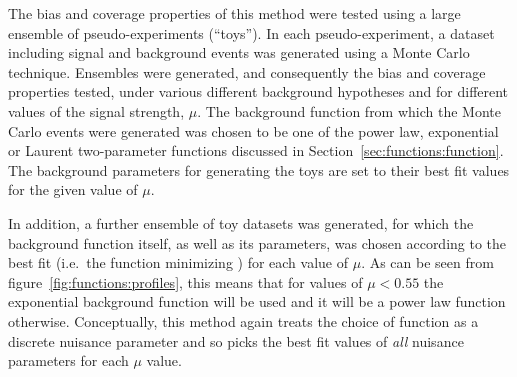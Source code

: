 The bias and coverage properties of this method were tested
using a large ensemble of
pseudo-experiments (``toys''). In each pseudo-experiment, a
dataset including signal and background events was generated using a Monte Carlo technique.
Ensembles were generated, and consequently the bias and coverage properties tested, under various different background hypotheses and for different values of the signal strength, $\mu$. The background function from which the Monte Carlo events were generated was chosen to be one of the power law,
exponential or Laurent two-parameter functions discussed in
Section~\ref{sec:functions:function}. The background parameters for generating the toys are set to their best fit values for the given value of $\mu$.

In addition, a further ensemble of toy datasets was generated, for which the background function itself, as well
as its parameters, was chosen according to the best fit (i.e.~the function minimizing \nll) for each value of $\mu$.
As can be seen from figure~\ref{fig:functions:profiles}, this means that for values of $\mu < 0.55$ the exponential background
function will be used and it will be a power law function otherwise.
Conceptually, this method again
treats the choice of function as a discrete nuisance parameter and so picks the
best fit values of {\em all\/} nuisance parameters for each $\mu$ value.

